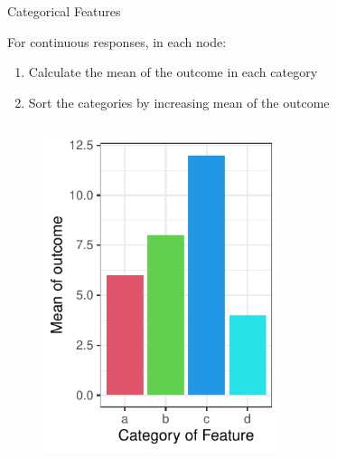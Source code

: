 \documentclass[11pt,compress,t,notes=noshow, xcolor=table]{beamer}
\begin{document}
\begin{vbframe}{Categorical Features}

For continuous responses, in each node:
  \begin{enumerate}
  \item Calculate the mean of the outcome in each category
  \item Sort the categories by increasing mean of the outcome
  \end{enumerate}

  \begin{columns}
  \begin{column}{0.33\textwidth}
  \begin{figure}
  \includegraphics[width=0.8\textwidth]{figure/categoryplot-cont1.pdf}
  \end{figure}
  \end{column}
  \begin{column}{0.33\textwidth}
  \begin{figure}

\end{figure}
\end{column}
\end{columns}
\end{vbframe}
\end{document}
